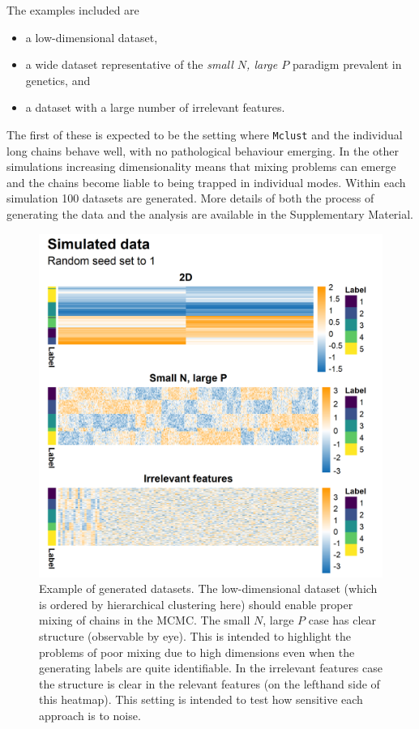 \documentclass{bioinfo}
\begin{document}
The examples included are
\begin{itemize}
	\item a low-dimensional dataset,
	\item a wide dataset representative of the \emph{small $N$, large $P$} paradigm prevalent in genetics, and
	\item a dataset with a large number of irrelevant features.
\end{itemize}
The first of these is expected to be the setting where \texttt{Mclust} and the individual long chains behave well, with no pathological behaviour emerging. In the other simulations increasing dimensionality means that mixing problems can emerge and the chains become liable to being trapped in individual modes. Within each simulation 100 datasets are generated. More details of both the process of generating the data and the analysis are available in the Supplementary Material.

\begin{figure}
	\centering
	\includegraphics[scale=0.6]{./Images/Simulations/Data.png}
	\caption{Example of generated datasets. The low-dimensional dataset (which is ordered by hierarchical clustering here) should enable proper mixing of chains in the MCMC. The small $N$, large $P$ case has clear structure (observable by eye). This is intended to highlight the problems of poor mixing due to high dimensions even when the generating labels are quite identifiable. In the irrelevant features case the structure is clear in the relevant features (on the lefthand side of this heatmap). This setting is intended to test how sensitive each approach is to noise.}
	\label{fig:genData}
\end{figure}
\end{document}
